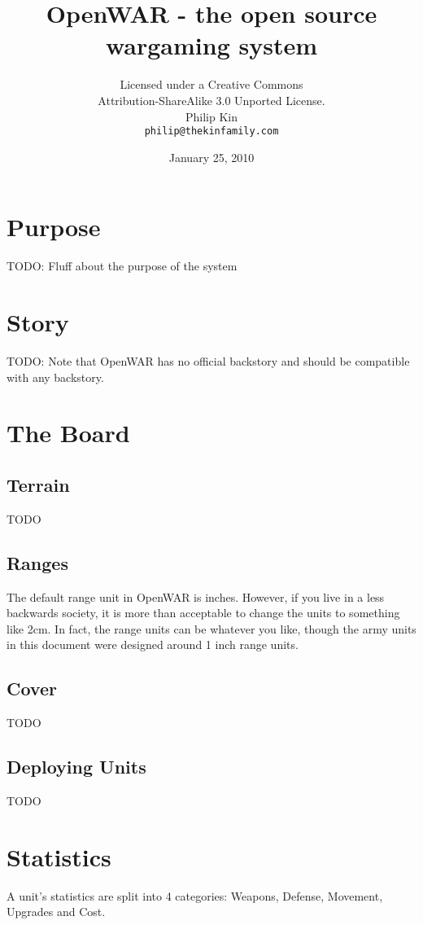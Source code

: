 \documentclass{article}
\begin{document}
\title{OpenWAR - the open source wargaming system}
\author{{\small Licensed under a Creative Commons}\\
  {\small Attribution-ShareAlike 3.0 Unported License.}\\
  Philip Kin\\
  \texttt{philip@thekinfamily.com}}
\date{January 25, 2010}
\maketitle
\tableofcontents

\newpage

\section{Purpose}
TODO: Fluff about the purpose of the system

\section{Story}
TODO: Note that OpenWAR has no official backstory and should be compatible with any backstory.

\section{The Board}
\subsection{Terrain}
TODO
\subsection{Ranges}
The default range unit in OpenWAR is inches.  However, if you live in a less backwards society, it is more than acceptable to change the units to something like 2cm. In fact, the range units can be whatever you like, though the army units in this document were designed around 1 inch range units.
\subsection{Cover}
TODO
\subsection{Deploying Units}
TODO
\section{Statistics}
A unit's statistics are split into 4 categories: Weapons, Defense, Movement, Upgrades and Cost.
\end{document}
